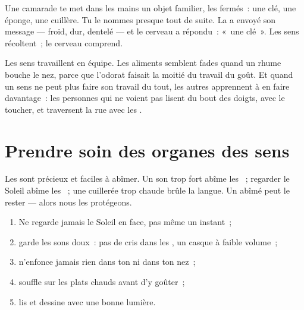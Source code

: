 \begin{example}\label{ex:g1:the-five-senses:dark}
Une camarade te met dans les mains un objet familier, les 
fermés~: une clé, une éponge, une cuillère. Tu le nommes presque
tout de suite. La  a envoyé son message --- froid, dur, dentelé
--- et le cerveau a répondu~: «~une clé~». Les sens récoltent~; le
cerveau comprend.
\end{example}

\begin{remark}\label{rem:g1:the-five-senses:together}
Les sens travaillent en équipe. Les aliments semblent fades quand un
rhume bouche le nez, parce que l'odorat faisait la moitié du travail
du goût. Et quand un sens ne peut plus faire son travail du tout,
les autres apprennent à en faire davantage~: les personnes qui ne
voient pas lisent du bout des doigts, avec le toucher, et traversent
la rue avec les .
\end{remark}

\section{Prendre soin des organes des sens}

\begin{proposition}\label{prop:g1:the-five-senses:fragile}
Les  sont précieux et faciles à abîmer. Un son trop
fort abîme les ~; regarder le Soleil abîme les ~; une
cuillerée trop chaude brûle la langue. Un  abîmé peut
le rester --- alors nous les protégeons.
\end{proposition}
\admitted

\begin{method}\label{met:g1:the-five-senses:protect}
\begin{enumerate}
  \item Ne regarde jamais le Soleil en face, pas même un instant~;
  \item garde les sons doux~: pas de cris dans les , un
        casque à faible volume~;
  \item n'enfonce jamais rien dans ton  ni dans ton nez~;
  \item souffle sur les plats chauds avant d'y goûter~;
  \item lis et dessine avec une bonne lumière.
\end{enumerate}
\end{method}


